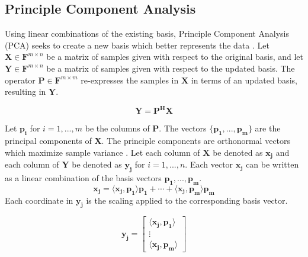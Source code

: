 \documentclass[conference]{IEEEtran}
\begin{document}
    \subsection{Principle Component Analysis} \label{pca_section}
    
    Using linear combinations of the existing basis, Principle Component Analysis (PCA) seeks to create a new basis which better represents the data \cite{shlens_2014_tutorial}. Let $\mathbf{X} \in \mathbf{F}^{m \times n}$ be a matrix of samples given with respect to the original basis, and let $\mathbf{Y} \in \mathbf{F}^{m \times n}$ be a matrix of samples given with respect to the updated basis. The operator $\mathbf{P} \in \mathbf{F}^{m \times m}$ re-expresses the samples in $\mathbf{X}$ in terms of an updated basis, resulting in $\mathbf{Y}$.
    
    \begin{equation}
    		\mathbf{Y} = \mathbf{P^{H}X}
    \end{equation}
    
    Let $\mathbf{p_i}$ for $i = 1,...,m$ be the columns of $\mathbf{P}$. The vectors $\{\mathbf{p_1},...,\mathbf{p_m}\}$ are the principal components of $\mathbf{X}$. The principle components are orthonormal vectors which maximize sample variance \cite{shlens_2014_tutorial}. Let each column of $\mathbf{X}$ be denoted as $\mathbf{x_j}$ and each column of $\mathbf{Y}$ be denoted as $\mathbf{y_j}$ for $i = 1,...,n$. Each vector $\mathbf{x_j}$ can be written as a linear combination of the basis vectors $\mathbf{p_1},...,\mathbf{p_m}$.
    \begin{equation}
        \mathbf{x_j} = \langle \mathbf{x_j}, \mathbf{p_1}\rangle \mathbf{p_1} + \cdots + \langle \mathbf{x_j}, \mathbf{p_m}\rangle \mathbf{p_m}
    \end{equation}
    Each coordinate in $\mathbf{y_j}$ is the scaling applied to the corresponding basis vector.
    	
    \begin{equation}
        \mathbf{y_j} = \begin{bmatrix}
                        \langle \mathbf{x_j}, \mathbf{p_1} \rangle\\
                        \vdots \\
                        \langle \mathbf{x_j}, \mathbf{p_m}\rangle
                        \end{bmatrix}
    \end{equation}
    	
\end{document}
